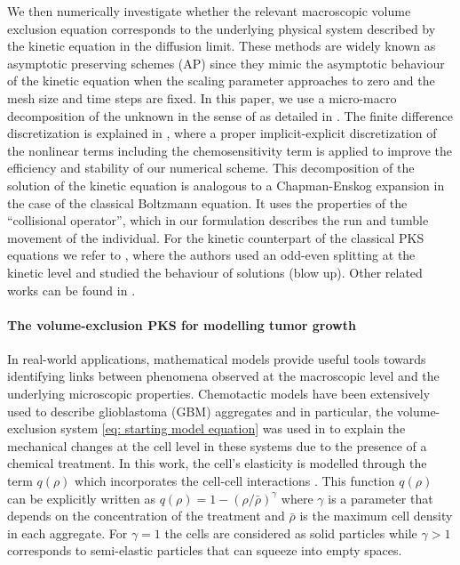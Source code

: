\documentclass[review,onefignum,onetabnum]{siamart220329}
\begin{document}
We then numerically investigate whether the relevant macroscopic volume exclusion equation corresponds to the underlying physical system described by the kinetic equation { in the diffusion limit}. These methods are widely known as asymptotic preserving schemes (AP) \cite{filbet2010class,jin1999efficient} since they mimic the asymptotic behaviour of the kinetic equation when the scaling parameter approaches to zero and the mesh size and time steps are fixed. In this paper, we use a micro-macro decomposition of the unknown in the sense of  \cite{LemouMieussens} as detailed in . {The finite difference discretization is explained in , where a proper implicit-explicit discretization of the nonlinear terms including the chemosensitivity term is applied to improve the efficiency and stability of our numerical scheme.} This decomposition of the solution of the kinetic equation is analogous to a Chapman-Enskog expansion in the case of the classical Boltzmann equation. It uses the properties of the ``collisional operator'', which in our formulation describes the run and tumble movement of the individual. For the kinetic counterpart of the classical PKS equations we refer to \cite{carrillo2013asymptotic}, where the authors used an odd-even splitting at the kinetic level and studied the behaviour of solutions (blow up). Other related works can be found in \cite{emako2016well,wang2019asymptotic,jin2011class,chertock2019high}. 

\paragraph{The volume-exclusion PKS for modelling tumor growth} {In real-world applications,} mathematical models provide useful tools towards identifying links between phenomena observed at the macroscopic level and the underlying microscopic properties. Chemotactic models have been extensively used to describe glioblastoma (GBM) aggregates  \cite{Vital2011} and in particular, the volume-exclusion system \cref{eq: starting model equation} was used in \cite{almeida2020treatment} to explain the mechanical changes at the cell level in these systems due to the presence of a chemical treatment. In this work, the cell's elasticity is modelled through the term $q(\rho)$ which incorporates the cell-cell interactions \cite{wang2007classical}. This function $q(\rho)$ can be explicitly written as $q(\rho)=1-(\rho/\bar{\rho})^\gamma$ where $\gamma$ is a parameter that depends on the concentration of the treatment and $\bar{\rho}$ is the maximum cell density in each aggregate. For $\gamma=1$ the cells are considered as solid particles while {$\gamma>1$  corresponds to semi-elastic particles} that can squeeze into empty spaces.
\end{document}

